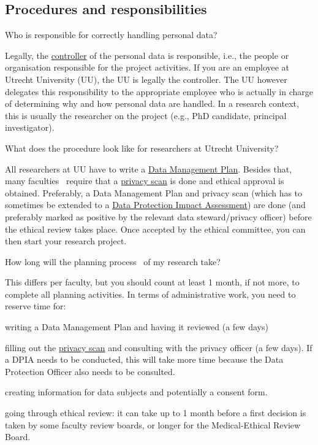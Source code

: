 \documentclass[
]{book}
\begin{document}
\hypertarget{procedures}{%
\subsection{Procedures and responsibilities}\label{procedures}}

Who is responsible for correctly handling personal data?

Legally, the \protect\hyperlink{definitions}{controller} of the personal data is responsible, i.e., the people or organisation responsible for the project activities. If you are an employee at Utrecht University (UU), the UU is legally the controller. The UU however delegates this responsibility to the appropriate employee who is actually in charge of determining why and how personal data are handled. In a research context, this is usually the researcher on the project (e.g., PhD candidate, principal investigator).

What does the procedure look like for researchers at Utrecht University?

All researchers at UU have to write a \href{https://www.uu.nl/en/research/research-data-management/guides/data-management-planning}{Data Management Plan}. Besides that, many faculties ~require that a \protect\hyperlink{privacy-scan}{privacy scan} is done and ethical approval is obtained. Preferably, a Data Management Plan and privacy scan (which has to sometimes be extended to a \protect\hyperlink{dpia}{Data Protection Impact Assessment}) are done (and preferably marked as positive by the relevant data steward/privacy officer) before the ethical review takes place. Once accepted by the ethical committee, you can then start your research project.

How long will the planning process ~of my research take?

This differs per faculty, but you should count at least 1 month, if not more, to complete all planning activities. In terms of administrative work, you need to reserve time for:

writing a Data Management Plan and having it reviewed (a few days)

filling out the \protect\hyperlink{privacy-scan}{privacy scan} and consulting with the privacy officer (a few days). If a DPIA needs to be conducted, this will take more time because the Data Protection Officer also needs to be consulted.

creating information for data subjects and potentially a consent form.

going through ethical review: it can take up to 1 month before a first decision is taken by some faculty review boards, or longer for the Medical-Ethical Review Board.
\end{document}
